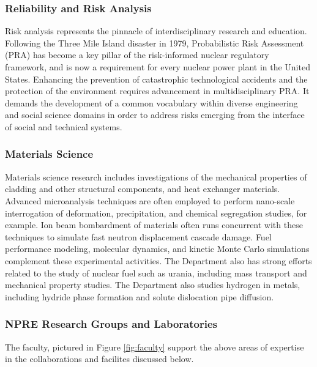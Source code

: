 \subsubsection{Reliability and Risk Analysis}
Risk analysis represents the pinnacle of interdisciplinary research and education. Following the Three Mile Island disaster in 1979, Probabilistic Risk Assessment (PRA) has become a key pillar of the risk-informed nuclear regulatory framework, and is now a requirement for every nuclear power plant in the United States. Enhancing the prevention of catastrophic technological accidents and the protection of the environment requires advancement in multidisciplinary PRA. It demands the development of a common vocabulary within diverse engineering and social science domains in order to address risks emerging from the interface of social and technical systems.


\subsubsection{Materials Science}
Materials science research includes investigations of the mechanical properties of cladding and other structural components, and heat exchanger materials. Advanced microanalysis techniques are often employed to perform nano-scale interrogation of deformation, precipitation, and chemical segregation studies, for example. Ion beam bombardment of materials often runs concurrent with these techniques to simulate fast neutron displacement cascade damage. Fuel performance modeling, molecular dynamics, and kinetic Monte Carlo simulations complement these experimental activities. The Department also has strong efforts related to the study of nuclear fuel such as urania, including mass transport and mechanical property studies. The Department also studies hydrogen in metals, including hydride phase formation and solute dislocation pipe diffusion.

\subsubsection{NPRE Research Groups and Laboratories}
The faculty, pictured in Figure \ref{fig:faculty} support the above areas of 
expertise in the collaborations and facilites discussed below.

